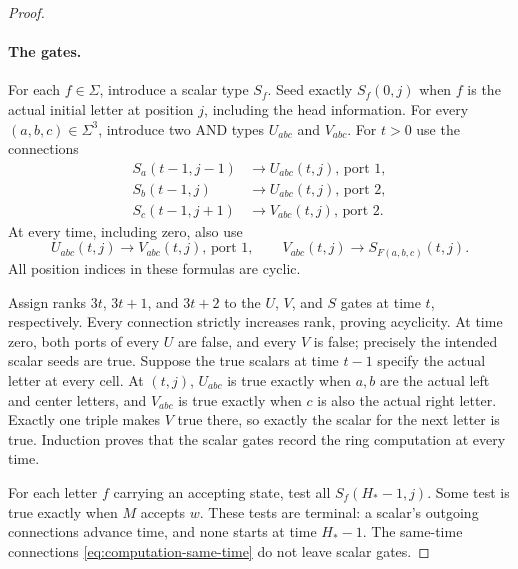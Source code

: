 \documentclass[11pt]{article}
\theoremstyle{definition}
\begin{document}
\begin{proof}
\paragraph{The gates.}
For each $f\in\Sigma$, introduce a scalar type $S_f$. Seed exactly
$S_f(0,j)$ when $f$ is the actual initial letter at position $j$, including
the head information. For every $(a,b,c)\in\Sigma^3$, introduce two AND
types $U_{abc}$ and $V_{abc}$. For $t>0$ use the connections
\begin{align}
 S_a(t-1,j-1)&\longrightarrow U_{abc}(t,j)\text{, port }1,
 \label{eq:computation-left}\\
 S_b(t-1,j)&\longrightarrow U_{abc}(t,j)\text{, port }2,
 \label{eq:computation-center}\\
 S_c(t-1,j+1)&\longrightarrow V_{abc}(t,j)\text{, port }2.
 \label{eq:computation-right}
\end{align}
At every time, including zero, also use
\begin{equation}\label{eq:computation-same-time}
 U_{abc}(t,j)\longrightarrow V_{abc}(t,j)\text{, port }1,
 \qquad
 V_{abc}(t,j)\longrightarrow S_{F(a,b,c)}(t,j).
\end{equation}
All position indices in these formulas are cyclic.

Assign ranks $3t$, $3t+1$, and $3t+2$ to the $U$, $V$, and $S$ gates at
time $t$, respectively. Every connection strictly increases rank, proving
acyclicity. At time zero, both ports of every $U$ are false, and every $V$
is false; precisely the intended scalar seeds are true. Suppose the true
scalars at time $t-1$ specify the actual letter at every cell. At $(t,j)$,
$U_{abc}$ is true exactly when $a,b$ are the actual left and center
letters, and $V_{abc}$ is true exactly when $c$ is also the actual right
letter. Exactly one triple makes $V$ true there, so exactly the scalar
for the next letter is true. Induction proves that the scalar gates
record the ring computation at every time.

For each letter $f$ carrying an accepting state, test all
$S_f(H_*-1,j)$. Some test is true exactly when $M$ accepts $w$.
These tests are terminal: a scalar's outgoing connections advance time,
and none starts at time $H_*-1$. The same-time connections
\eqref{eq:computation-same-time} do not leave scalar gates.


\end{proof}
\end{document}
